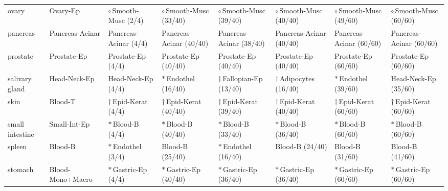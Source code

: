 \begin{table}[t]
{\begin{tabular}{llllllll}
ovary & Ovary-Ep & \cellcolor{olive!18}$\circ$\,Smooth-Musc (2/4) & \cellcolor{olive!18}$\circ$\,Smooth-Musc (33/40) & \cellcolor{olive!18}$\circ$\,Smooth-Musc (39/40) & \cellcolor{olive!18}$\circ$\,Smooth-Musc (40/40) & \cellcolor{olive!18}$\circ$\,Smooth-Musc (49/60) & \cellcolor{olive!18}$\circ$\,Smooth-Musc (60/60) \\
pancreas & Pancreas-Acinar & \cellcolor{teal!15}Pancreas-Acinar (4/4) & \cellcolor{teal!15}Pancreas-Acinar (40/40) & \cellcolor{teal!15}Pancreas-Acinar (38/40) & \cellcolor{teal!15}Pancreas-Acinar (40/40) & \cellcolor{teal!15}Pancreas-Acinar (60/60) & \cellcolor{teal!15}Pancreas-Acinar (60/60) \\
prostate & Prostate-Ep & \cellcolor{teal!15}Prostate-Ep (4/4) & \cellcolor{teal!15}Prostate-Ep (40/40) & \cellcolor{teal!15}Prostate-Ep (40/40) & \cellcolor{teal!15}Prostate-Ep (40/40) & \cellcolor{teal!15}Prostate-Ep (60/60) & \cellcolor{teal!15}Prostate-Ep (60/60) \\
salivary gland & Head-Neck-Ep & \cellcolor{teal!15}Head-Neck-Ep (4/4) & \cellcolor{blue!12}$\ast$\,Endothel (16/40) & \cellcolor{magenta!15}$\dagger$\,Fallopian-Ep (13/40) & \cellcolor{magenta!15}$\dagger$\,Adipocytes (16/40) & \cellcolor{blue!12}$\ast$\,Endothel (39/60) & \cellcolor{teal!15}Head-Neck-Ep (35/60) \\
skin & Blood-T & \cellcolor{magenta!15}$\dagger$\,Epid-Kerat (4/4) & \cellcolor{magenta!15}$\dagger$\,Epid-Kerat (40/40) & \cellcolor{magenta!15}$\dagger$\,Epid-Kerat (39/40) & \cellcolor{magenta!15}$\dagger$\,Epid-Kerat (40/40) & \cellcolor{magenta!15}$\dagger$\,Epid-Kerat (60/60) & \cellcolor{magenta!15}$\dagger$\,Epid-Kerat (60/60) \\
small intestine & Small-Int-Ep & \cellcolor{blue!12}$\ast$\,Blood-B (4/4) & \cellcolor{blue!12}$\ast$\,Blood-B (40/40) & \cellcolor{blue!12}$\ast$\,Blood-B (33/40) & \cellcolor{blue!12}$\ast$\,Blood-B (36/40) & \cellcolor{blue!12}$\ast$\,Blood-B (60/60) & \cellcolor{blue!12}$\ast$\,Blood-B (60/60) \\
spleen & Blood-B & \cellcolor{blue!12}$\ast$\,Endothel (3/4) & \cellcolor{teal!15}Blood-B (25/40) & \cellcolor{blue!12}$\ast$\,Endothel (16/40) & \cellcolor{teal!15}Blood-B (24/40) & \cellcolor{teal!15}Blood-B (31/60) & \cellcolor{teal!15}Blood-B (41/60) \\
stomach & Blood-Mono+Macro & \cellcolor{blue!12}$\ast$\,Gastric-Ep (4/4) & \cellcolor{blue!12}$\ast$\,Gastric-Ep (40/40) & \cellcolor{blue!12}$\ast$\,Gastric-Ep (36/40) & \cellcolor{blue!12}$\ast$\,Gastric-Ep (36/40) & \cellcolor{blue!12}$\ast$\,Gastric-Ep (60/60) & \cellcolor{blue!12}$\ast$\,Gastric-Ep (60/60) \\

\end{tabular}}
\end{table}
